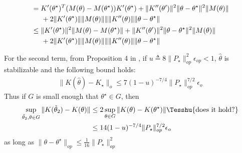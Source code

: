 \begin{enumerate}
\begin{align*}
    &=  K'(\theta^\star)^T(M(\theta) - M(\theta^\star))K'(\theta^\star) + \|K''(\theta')\|^2\|\theta-\theta^\star\|^2\|M(\theta)\| \\
    &\hspace{5mm}+ 2\|K'(\theta^\star)\|\|M(\theta)\|\|\|K''(\theta)\|\|\theta-\theta^\star\| \\
    &\leq \|K'(\theta^\star)\|^2\|M(\theta) - M(\theta^\star)\| + \|K''(\theta')\|^2\|\theta-\theta^\star\|^2\|M(\theta)\|\\
    &\hspace{5mm}+ 2\|K'(\theta^\star)\|\|M(\theta)\|\|\|K''(\theta)\|\|\theta-\theta^\star\|
\end{align*}


For the second term, from Proposition 4 in \citep{simchowitz2020naive}, if $u\triangleq8\|P_\star\|_{op}^2\epsilon_{op}<1$, $\hat\theta$ is stabilizable and the following bound holds:
\begin{align*}
    \|K(\hat\theta) - K_\star\|_o \leq 7(1-u)^{-7/4}\|P_\star\|_{op}^{7/2}\epsilon_o
\end{align*}
Thus if $G$ is small enough that $\theta^\star\in G$, then
\begin{align*}
    \sup_{\tilde\theta_2,\theta\in G}\|K(\tilde\theta_2) - K(\theta)\|
    &\leq 2\sup_{\theta\in G}\|K(\theta) - K(\theta^\star)\| \Tesshu{\text{does it hold?}} \\
    &\leq 14(1-u)^{-7/4}\|P_\star\|_{op}^{7/2}\epsilon_o
\end{align*}
as long as $\|\theta-\theta^\star\|_{op}\leq\frac{1}{16}\|P_\star\|_{op}^2$

\end{enumerate}
